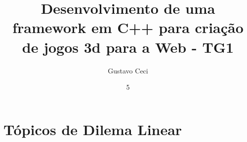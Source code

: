 \documentclass[tg]{ita}    %
\author{Gustavo Ceci}{Guimarães}
\title{Desenvolvimento de uma framework em C++ para criação de jogos 3d para a Web - TG1}
\date{5}{março}{2015}
\begin{document}
\maketitle

\begin{itadedication}

\end{itadedication}

\begin{itathanks}

\end{itathanks}

\thispagestyle{empty}
\ifhyperref{}\fi
\begin{flushright}
\begin{spacing}{1}
\mbox{}\vfill

\end{spacing}
\end{flushright}

\begin{abstract}

\end{abstract}

\begin{englishabstract}

\end{englishabstract}

\listoffigures %

\listoftables %

\listofabbreviations

\listofsymbols

\tableofcontents

\mainmatter






\renewcommand\bibname{\itareferencesnamebabel} %


\appendix
\chapter{Tópicos de Dilema Linear} %

\end{document}
